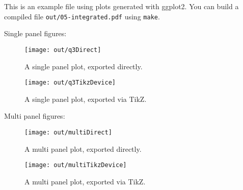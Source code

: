 \documentclass[twocolumn]{article}
\begin{document}
This is an example file using plots generated with ggplot2.
You can build a compiled file \texttt{out/05-integrated.pdf} using \texttt{make}.

Single panel figures:
\begin{figure}[h]
\begin{center}
    \texttt{[image: out/q3Direct]}
\end{center}
\caption{A single panel plot, exported directly.}\label{fig:q3Direct}
\end{figure}
\begin{figure}[h]
\begin{center}
    \texttt{[image: out/q3TikzDevice]}
\end{center}
\caption{A single panel plot, exported via TikZ.}\label{fig:q3TikzDevice}
\end{figure}

Multi panel figures:
\begin{figure}[h]
\begin{center}
    \texttt{[image: out/multiDirect]}
\end{center}
\caption{A multi panel plot, exported directly.}\label{fig:multiDirect}
\end{figure}
\begin{figure}[h]
\begin{center}
    \texttt{[image: out/multiTikzDevice]}
\end{center}
\caption{A multi panel plot, exported via TikZ.}\label{fig:multiTikzDevice}
\end{figure}
\end{document}
